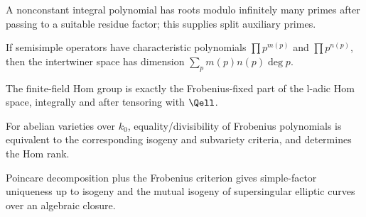 \begin{lemma}
\label{mumford-app1-polynomial-prime-lemma}
A nonconstant integral polynomial has roots modulo infinitely many primes after
passing to a suitable residue factor; this supplies split auxiliary primes.
\notready
\end{lemma}

\begin{lemma}
\label{mumford-app1-linear-algebra-commutant-lemma}
If semisimple operators have characteristic polynomials
$\prod p^{m(p)}$ and $\prod p^{n(p)}$, then the intertwiner space has dimension
$\sum_p m(p)n(p)\deg p$.
\notready
\end{lemma}

\begin{theorem}
\label{mumford-app1-tate-theorem-finite-field-invariant-form}
The finite-field Hom group is exactly the Frobenius-fixed part of the l-adic
Hom space, integrally and after tensoring with $\Qell$.
\notready
\end{theorem}

\begin{theorem}
\label{mumford-app1-finite-field-equivalences}
For abelian varieties over $k_0$, equality/divisibility of Frobenius
polynomials is equivalent to the corresponding isogeny and subvariety
criteria, and determines the Hom rank.
\notready
\end{theorem}

\begin{corollary}
\label{mumford-app1-simple-factor-structure}
Poincare decomposition plus the Frobenius criterion gives simple-factor
uniqueness up to isogeny and the mutual isogeny of supersingular elliptic
curves over an algebraic closure.
\notready
\end{corollary}
